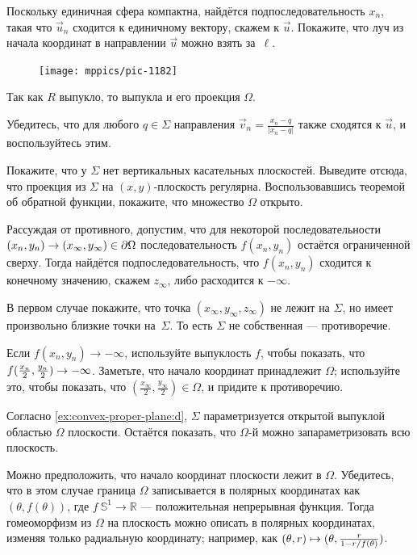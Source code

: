 \begin{multicols}{2}
Поскольку единичная сфера компактна, найдётся подпоследовательность $x_n$, такая что $\vec u_n$ сходится к единичному вектору, скажем к $\vec u$.
Покажите, что луч из начала координат в направлении $\vec u$ можно взять за~$\ell$.

\begin{figure}
\vskip-0mm
\centering
\texttt{[image: mppics/pic-1182]}
\vskip-3mm
\end{figure}

Так как $R$ выпукло, то выпукла и его проекция $\Omega$.

Убедитесь, что для любого $q\in \Sigma$ направления $\vec v_n=\tfrac{x_n-q}{|x_n-q|}$ также сходятся к $\vec u$, и воспользуйтесь этим.

Покажите, что у $\Sigma$ нет вертикальных касательных плоскостей.
Выведите отсюда, что проекция из $\Sigma$ на $(x,y)$-плоскость регулярна.
Воспользовавшись теоремой об обратной функции, покажите, что множество $\Omega$ открыто.

Рассуждая от противного, допустим, что для некоторой последовательности $(x_n,y_n)\z\to(x_\infty,y_\infty)\in \partial\Omega$ последовательность $f(x_n,y_n)$ остаётся ограниченной сверху.
Тогда найдётся подпоследовательность, что $f(x_n,y_n)$ сходится к конечному значению, скажем $z_\infty$, либо расходится к $-\infty$.

В первом случае покажите, что точка $(x_\infty, y_\infty,z_\infty)$ не лежит на $\Sigma$, но имеет произвольно близкие точки на~$\Sigma$.
То есть $\Sigma$ не собственная --- противоречие.

Если $f(x_n,y_n)\to -\infty$, используйте выпуклость $f$, чтобы показать, что $f(\tfrac{x_n}2 ,\tfrac{y_n}2)\z\to -\infty$.
Заметьте, что начало координат принадлежит $\Omega$;
используйте это, чтобы показать, что $(\tfrac{x_\infty}2, \tfrac{y_\infty}2)\in\Omega$,
и придите к противоречию.

Согласно \ref{ex:convex-proper-plane:d}, $\Sigma$ параметризуется открытой выпуклой областью $\Omega$ плоскости.
Остаётся показать, что $\Omega$-й можно запараметризовать всю плоскость.

Можно предположить, что начало координат плоскости лежит в $\Omega$.
Убедитесь, что в этом случае граница $\Omega$ записывается в полярных координатах как $(\theta,f(\theta))$, где $f\:\mathbb{S}^1\to\mathbb{R}$ --- положительная непрерывная функция.
Тогда гомеоморфизм из $\Omega$ на плоскость можно описать в полярных координатах, изменяя только радиальную координату;
например, как 
$(\theta,r)\z\mapsto (\theta,
\tfrac{r}{1-r/f(\theta)})$.


\end{multicols}

